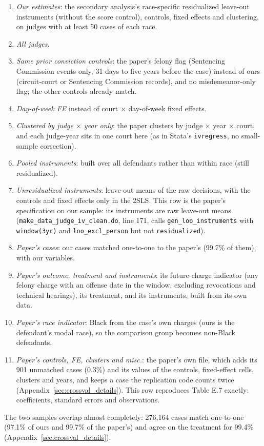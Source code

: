 \documentclass[11pt]{article}
\begin{document}
\begin{enumerate}
  \item[(1)] \emph{Our estimates}: the secondary analysis's race-specific residualized leave-out instruments (without the score control), controls, fixed effects and clustering, on judges with at least 50 cases of each race.
  \item[(2)] \emph{All judges}.
  \item[(3)] \emph{Same prior conviction controls}: the paper's felony flag (Sentencing Commission events only, 31 days to five years before the case) instead of ours (circuit-court or Sentencing Commission records), and no misdemeanor-only flag; the other controls already match.
  \item[(4)] \emph{Day-of-week FE} instead of court $\times$ day-of-week fixed effects.
  \item[(5)] \emph{Clustered by judge $\times$ year only}: the paper clusters by judge $\times$ year $\times$ court, and each judge-year sits in one court here (as in Stata's \texttt{ivregress}, no small-sample correction).
  \item[(6)] \emph{Pooled instruments}: built over all defendants rather than within race (still residualized).
  \item[(7)] \emph{Unresidualized instruments}: leave-out means of the raw decisions, with the controls and fixed effects only in the 2SLS. This row is the paper's specification on our sample: its instruments are raw leave-out means (\texttt{make\_\allowbreak data\_\allowbreak judge\_\allowbreak iv\_\allowbreak clean.do}, line 171, calls \texttt{gen\_loo\_\allowbreak instruments} with \texttt{window(3yr)} and \texttt{loo\_excl\_\allowbreak person} but not \texttt{residualized}).
  \item[(8)] \emph{Paper's cases}: our cases matched one-to-one to the paper's (99.7\% of them), with our variables.
  \item[(9)] \emph{Paper's outcome, treatment and instruments}: its future-charge indicator (any felony charge with an offense date in the window, excluding revocations and technical hearings), its treatment, and its instruments, built from its own data.
  \item[(10)] \emph{Paper's race indicator}: Black from the case's own charges (ours is the defendant's modal race), so the comparison group becomes non-Black defendants.
  \item[(11)] \emph{Paper's controls, FE, clusters and misc.}: the paper's own file, which adds its 901 unmatched cases (0.3\%) and its values of the controls, fixed-effect cells, clusters and years, and keeps a case the replication code counts twice (Appendix~\ref{sec:crossval_details}). This row reproduces Table E.7 exactly: coefficients, standard errors and observations.
\end{enumerate}
The two samples overlap almost completely: 276,164 cases match one-to-one (97.1\% of ours and 99.7\% of the paper's) and agree on the treatment for 99.4\% (Appendix~\ref{sec:crossval_details}).
\end{document}
